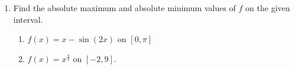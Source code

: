 \documentclass[12pt]{article}
\begin{document}
\begin{enumerate}[label = \arabic*)]
	\item Find the absolute maximum and absolute minimum values of $f$ on the given interval.
	
	\begin{enumerate}
	    \item $f(x) = x - \sin(2x)$ on $[0,\pi]$ 
	   
	    
	    \item $f(x) = x^{\frac{4}{3}}$ on $[-2,9]$.
	\end{enumerate}
    
\end{enumerate}
\end{document}
